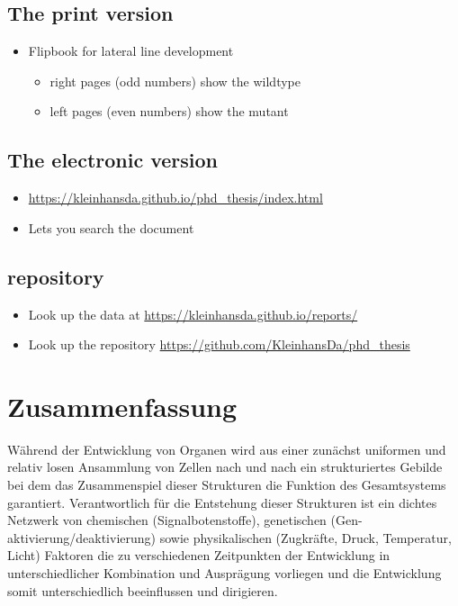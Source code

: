 \documentclass[11pt,singlespacinge,twoside]{reedthesis} %
\providecommand{\tightlist}{%
  \setlength{\itemsep}{0pt}\setlength{\parskip}{0pt}}
\begin{document}
\hypertarget{the-print-version}{%
\section*{The print version}\label{the-print-version}}
\begin{itemize}
\tightlist
\item
  Flipbook for lateral line development
  \begin{itemize}
  \tightlist
  \item
    right pages (odd numbers) show the wildtype
  \item
    left pages (even numbers) show the mutant
  \end{itemize}
\end{itemize}
\hypertarget{the-electronic-version}{%
\section*{The electronic version}\label{the-electronic-version}}
\begin{itemize}
\tightlist
\item
  \url{https://kleinhansda.github.io/phd_thesis/index.html}
\item
  Lets you search the document
\end{itemize}
\hypertarget{repository}{%
\section*{repository}\label{repository}}
\begin{itemize}
\tightlist
\item
  Look up the data at \url{https://kleinhansda.github.io/reports/}
\item
  Look up the repository \url{https://github.com/KleinhansDa/phd_thesis}
\end{itemize}
\hypertarget{zusammenfassung}{%
\chapter*{Zusammenfassung}\label{zusammenfassung}}

Während der Entwicklung von Organen wird aus einer zunächst uniformen und relativ losen Ansammlung von Zellen nach und nach ein strukturiertes Gebilde bei dem das Zusammenspiel dieser Strukturen die Funktion des Gesamtsystems garantiert. Verantwortlich für die Entstehung dieser Strukturen ist ein dichtes Netzwerk von chemischen (Signalbotenstoffe), genetischen (Gen-aktivierung/deaktivierung) sowie physikalischen (Zugkräfte, Druck, Temperatur, Licht) Faktoren die zu verschiedenen Zeitpunkten der Entwicklung in unterschiedlicher Kombination und Ausprägung vorliegen und die Entwicklung somit unterschiedlich beeinflussen und dirigieren.
\end{document}
